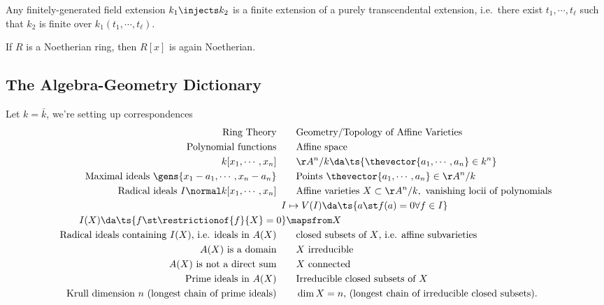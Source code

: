 \begin{theorem}\label{thm:noether_normalization}

Any finitely-generated field extension \(k_1 \injects k_2\) is a finite
extension of a purely transcendental extension, i.e.~there exist
\(t_1, \cdots, t_\ell\) such that \(k_2\) is finite over
\(k_1(t_1, \cdots, t_\ell)\).

\end{theorem}

\begin{theorem}\label{thm:hilbert_basis}

If \(R\) is a Noetherian ring, then \(R[x]\) is again Noetherian.

\end{theorem}

\hypertarget{the-algebra-geometry-dictionary}{%
\subsection{The Algebra-Geometry
Dictionary}\label{the-algebra-geometry-dictionary}}

Let \(k=\bar k\), we're setting up correspondences
\begin{align*}  
\text{Ring Theory} 
\quad&\quad 
\text{Geometry/Topology of Affine Varieties}
\\
\text{Polynomial functions} 
\quad&\quad 
\text{Affine space} 
\\
k[x_1, \cdots, x_n]
\quad&\quad 
\AA^n/k \da \ts{\thevector{a_1, \cdots, a_n} \in k^n } 
\\
\text{Maximal ideals } \gens{x_1 - a_1, \cdots, x_n - a_n} 
\quad&\quad 
\text{Points } \thevector{a_1, \cdots, a_n} \in \AA^n/k
\\
\text{Radical ideals } I\normal k[x_1, \cdots, x_n]
\quad&\quad 
\text{Affine varieties } X\subset  \AA^n/k, \text{ vanishing locii of polynomials} 
\\
I &\mapsto V(I) \da \ts{a\st f(a) = 0 \forall f\in I} \\
I(X) \da \ts{f \st \restrictionof{f}{X} = 0} &\mapsfrom X 
\\
\text{Radical ideals containing $I(X)$, i.e. ideals in $A(X)$} 
\quad&\quad 
\text{closed subsets of $X$, i.e. affine subvarieties}
\\
A(X) \text{ is a domain}
\quad&\quad 
\text{$X$ irreducible}
\\
\text{$A(X)$ is not a direct sum}
\quad&\quad 
\text{$X$ connected} 
\\
\text{Prime ideals in }A(X)
\quad&\quad 
\text{Irreducible closed subsets of }X
\\
\text{Krull dimension $n$ (longest chain of prime ideals)}
\quad&\quad 
\dim X = n,\, \text{(longest chain of irreducible closed subsets)}
.\end{align*}


